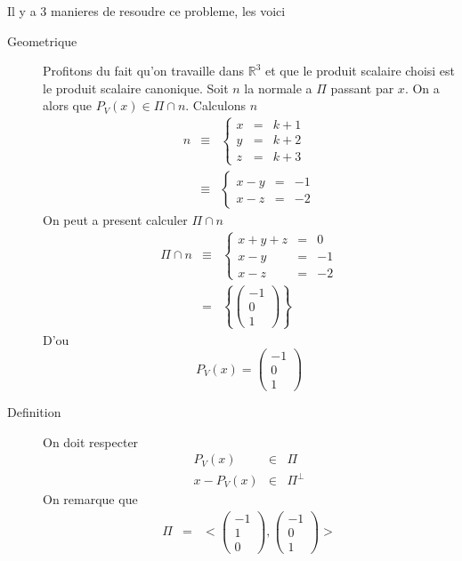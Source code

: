 \documentclass[11pt,a4paper]{article} %
\begin{document}
\begin{enumerate}
		Il y a 3 manieres de resoudre ce probleme, les voici
		\begin{description}
			\item[Geometrique]
				Profitons du fait qu'on travaille dans $\mathbb{R}^3$ et que le produit scalaire choisi est le produit scalaire canonique.
				Soit $n$ la normale a $\Pi$ passant par $x$. On a alors que $P_V(x) \in \Pi \cap n$. Calculons $n$
				\begin{eqnarray*}
					n & \equiv &
						\left\{
							\begin{array}{rcl}
								x & = & k + 1\\
								y & = & k + 2\\
								z & = & k + 3
							\end{array}
						\right.\\
					& \equiv &
						\left\{
							\begin{array}{rcl}
								x - y & = & -1\\
								x - z & = & -2
							\end{array}
						\right.
				\end{eqnarray*}
				On peut a present calculer $\Pi \cap n$
				\begin{eqnarray*}
					\Pi \cap n & \equiv &
						\left\{
							\begin{array}{rcl}
								x + y + z & = & 0\\
								x - y & = & -1\\
								x - z & = & -2
							\end{array}
						\right.\\
					& = & \left\{\begin{pmatrix}-1\\0\\1\end{pmatrix}\right\}
				\end{eqnarray*}
				D'ou
				\[
					P_V(x) = \begin{pmatrix}-1\\0\\1\end{pmatrix}
				\]
			\item[Definition]
				On doit respecter
				\begin{eqnarray}
					P_V(x) & \in & \Pi\label{eq_direct}\\
					x - P_V(x) & \in & \Pi^{\perp}\label{eq_perp}
				\end{eqnarray}
				On remarque que
				\begin{eqnarray*}
					\Pi & = & <\begin{pmatrix}-1\\1\\0\end{pmatrix}, \begin{pmatrix}-1\\0\\1\end{pmatrix}>\\

\end{eqnarray*}
\end{description}
\end{enumerate}
\end{document}
